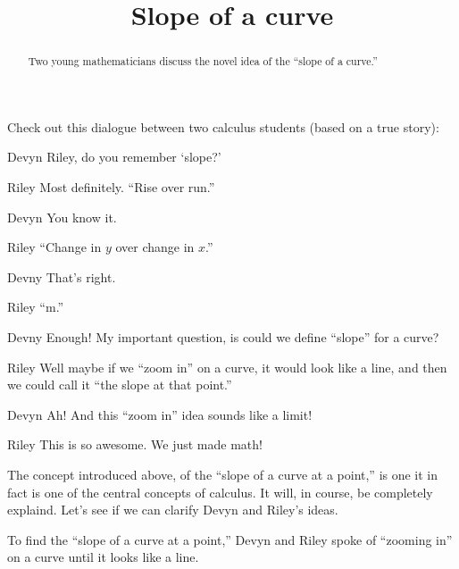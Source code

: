\documentclass{ximera}
\title[Break-Ground:]{Slope of a curve}
\begin{document}
\begin{abstract}
Two young mathematicians discuss the novel idea of the ``slope of a curve.''
\end{abstract}
\maketitle


Check out this dialogue between two calculus students (based on a true
story):

\begin{dialogue}
\item[Devyn] Riley, do you remember `slope?'
\item[Riley] Most definitely. ``Rise over run.''
\item[Devyn] You know it.
\item[Riley] ``Change in $y$ over change in $x$.''
\item[Devny] That's right.  
\item[Riley] ``m.''
\item[Devny] Enough! My important question, is could we define
  ``slope'' for a curve?
\item[Riley] Well maybe if we ``zoom in'' on a curve, it would look
  like a line, and then we could call it ``the slope at that point.''
\item[Devyn] Ah! And this ``zoom in'' idea sounds like a limit!
\item[Riley] This is so awesome. We just made math!
\end{dialogue}

The concept introduced above, of the ``slope of a curve at a point,''
is one it in fact is one of the central concepts of calculus. It will,
in course, be completely explaind.  Let's see if we can clarify Devyn
and Riley's ideas.


\begin{problem}
To find the ``slope of a curve at a point,'' Devyn and Riley spoke of
``zooming in'' on a curve until it looks like a line.
  \begin{freeResponse}
  \end{freeResponse}
\end{problem}



\end{document}
